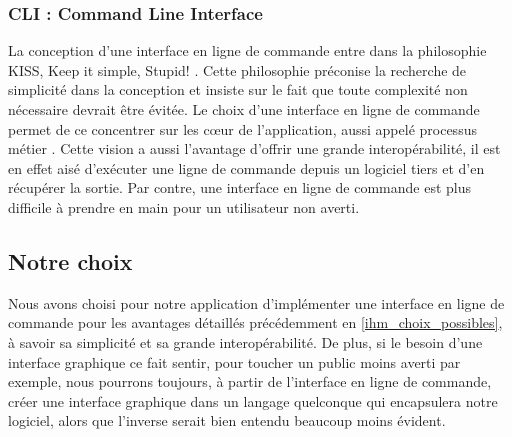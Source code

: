 		\subsubsection{CLI : \og Command Line Interface \fg{}}
			La conception d'une interface en ligne de commande entre dans la philosophie KISS, \og Keep it simple, Stupid! \fg{}. Cette philosophie préconise la recherche de simplicité dans la conception et insiste sur le fait que toute complexité non nécessaire devrait être évitée. Le choix d'une interface en ligne de commande permet de ce concentrer sur les cœur de l'application, aussi appelé \og processus métier \fg{}. Cette vision a aussi l'avantage d'offrir une grande interopérabilité, il est en effet aisé d'exécuter une ligne de commande depuis un logiciel tiers et d'en récupérer la sortie. Par contre, une interface en ligne de commande est plus difficile à prendre en main pour un utilisateur non averti.  
			
	\subsection{Notre choix}
		Nous avons choisi pour notre application d'implémenter une interface en ligne de commande pour les avantages détaillés précédemment en \ref{ihm_choix_possibles}, à savoir sa simplicité et sa grande interopérabilité. De plus, si le besoin d'une interface graphique ce fait sentir, pour toucher un public moins averti par exemple, nous pourrons toujours, à partir de l'interface en ligne de commande, créer une interface graphique dans un langage quelconque qui encapsulera notre logiciel, alors que l'inverse serait bien entendu beaucoup moins évident.

